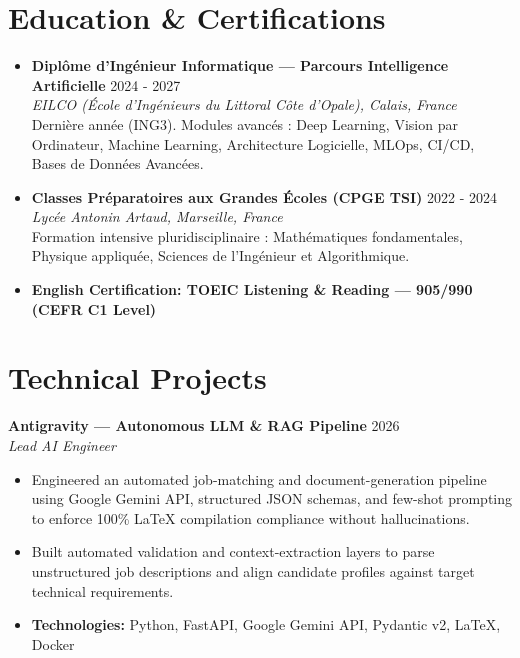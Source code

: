 \documentclass[10pt,a4paper]{article}
\begin{document}
\section{Education \& Certifications}
\begin{itemize}

    \item \textbf{Diplôme d'Ingénieur Informatique — Parcours Intelligence Artificielle} \hfill 2024 - 2027 \\
    \textit{EILCO (École d'Ingénieurs du Littoral Côte d'Opale), Calais, France} \\
    \footnotesize Dernière année (ING3). Modules avancés : Deep Learning, Vision par Ordinateur, Machine Learning, Architecture Logicielle, MLOps, CI/CD, Bases de Données Avancées.

    \item \textbf{Classes Préparatoires aux Grandes Écoles (CPGE TSI)} \hfill 2022 - 2024 \\
    \textit{Lycée Antonin Artaud, Marseille, France} \\
    \footnotesize Formation intensive pluridisciplinaire : Mathématiques fondamentales, Physique appliquée, Sciences de l'Ingénieur et Algorithmique.

    \item \textbf{English Certification: TOEIC Listening \& Reading — 905/990 (CEFR C1 Level)}
\end{itemize}

\section{Technical Projects}

\noindent
\textbf{Antigravity — Autonomous LLM \& RAG Pipeline} \hfill 2026 \\
\textit{Lead AI Engineer}
\begin{itemize}

    \item Engineered an automated job-matching and document-generation pipeline using Google Gemini API, structured JSON schemas, and few-shot prompting to enforce 100\% LaTeX compilation compliance without hallucinations.

    \item Built automated validation and context-extraction layers to parse unstructured job descriptions and align candidate profiles against target technical requirements.


    \item \textbf{Technologies:} Python, FastAPI, Google Gemini API, Pydantic v2, LaTeX, Docker

\end{itemize}
\vspace{0.25em}
\end{document}
